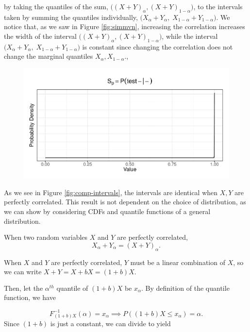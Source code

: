 \documentclass[12pt,twoside]{smiththesis}
\begin{document}
 by taking the quantiles of the sum, \(\Big((X+Y)_\alpha, (X+Y)_{1-\alpha}\Big)\), to the intervals taken by summing the quantiles individually, \(\Big(X_\alpha +Y_\alpha, \; X_{1-\alpha} +Y_{1-\alpha}\Big)\). We notice that, as we saw in Figure \ref{fig:simmvn}, increasing the correlation increases the width of the interval \(\Big((X+Y)_\alpha, (X+Y)_{1-\alpha}\Big)\), while the interval \(\Big(X_\alpha +Y_\alpha, \; X_{1-\alpha} +Y_{1-\alpha}\Big)\) is constant since changing the correlation does not change the marginal quantiles \(X_\alpha, X_{1-\alpha}\).,
\begin{figure}

{\centering \includegraphics{thesis_files/figure-latex/unnamed-chunk-64-1} 

}

\caption{\label{fig:comp-intervals}}\label{fig:unnamed-chunk-64}
\end{figure}
As we see in Figure \ref{fig:comp-intervals}, the intervals are identical when \(X,Y\) are perfectly correlated. This result is not dependent on the choice of distribution, as we can show by considering CDFs and quantile functions of a general distribution.
\begin{tcolorbox}[title = Quantiles of the Sum of Perfectly Correlated Random Variables]
When two random variables $X$ and $Y$ are perfectly correlated,
$$X_\alpha + Y_\alpha = (X+Y)_\alpha.$$
\end{tcolorbox}
When \(X\) and \(Y\) are perfectly correlated, \(Y\) must be a linear combination of \(X\), so we can write \(X+Y= X+bX=(1+b)X\).

Then, let the \(\alpha^{th}\) quantile of \((1+b)X\) be \(x_\alpha\). By definition of the quantile function, we have

\[F^{-1}_{(1+b) X } (\alpha) = x_\alpha \implies P((1+b) X \leq x_\alpha) = \alpha.\]
Since \((1+b)\) is just a constant, we can divide to yield
\end{document}
